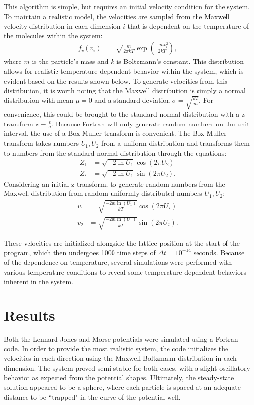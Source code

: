 \documentclass[12pt]{article}
\begin{document}
This algorithm is simple, but requires an initial velocity condition for the system.  To maintain a realistic model, the velocities are sampled from the Maxwell velocity distribution in each dimension $i$ that is dependent on the temperature of the molecules within the system:
\begin{align}
f_v(v_i) &= \sqrt{\frac{m}{2\pi k T}}\exp\left(\frac{-mv_i^2}{2kT}\right),
\end{align}  where $m$ is the particle's mass and $k$ is Boltzmann's constant.  This distribution allows for realistic temperature-dependent behavior within the system, which is evident based on the results shown below.  To generate velocities from this distribution, it is worth noting that the Maxwell distribution is simply a normal distribution with mean $\mu = 0$ and a standard deviation $\sigma = \sqrt{\frac{kT}{m}}$.  For convenience, this could be brought to the standard normal distribution with a z-transform $z = \frac{v}{\sigma}$.  Because Fortran will only generate random numbers on the unit interval, the use of a Box-Muller transform is convenient. \cite{boxmuller}  The Box-Muller transform takes numbers $U_1, U_2$  from a uniform distribution and transforms them to numbers from the standard normal distribution through the equations:
\begin{align}
Z_1 &= \sqrt{-2\ln U_1}\cos(2\pi U_2) \\
Z_2 &= \sqrt{-2\ln U_1}\sin(2\pi U_2).
\end{align}
Considering an initial z-transform, to generate random numbers from the Maxwell distribution from random uniformly distributed numbers $U_1, U_2$:
\begin{align}
v_1 & = \sqrt{\frac{-2m\ln(U_1)}{kT}}\cos(2\pi U_2) \\
v_2 & = \sqrt{\frac{-2m\ln(U_1)}{kT}}\sin(2\pi U_2).
\end{align}

These velocities are initialized alongside the lattice position at the start of the program, which then undergoes 1000 time steps of $\Delta t = 10^{-14}$ seconds.  Because of the dependence on temperature, several simulations were performed with various temperature conditions to reveal some temperature-dependent behaviors inherent in the system.

\section*{Results}
Both the Lennard-Jones and Morse potentials were simulated using a Fortran code.  In order to provide the most realistic system, the code initializes the velocities in each direction using the Maxwell-Boltzmann distribution in each dimension.  The system proved semi-stable for both cases, with a slight oscillatory behavior as expected from the potential shapes.  Ultimately, the steady-state solution appeared to be a sphere, where each particle is spaced at an adequate distance to be ``trapped" in the curve of the potential well.
\end{document}
